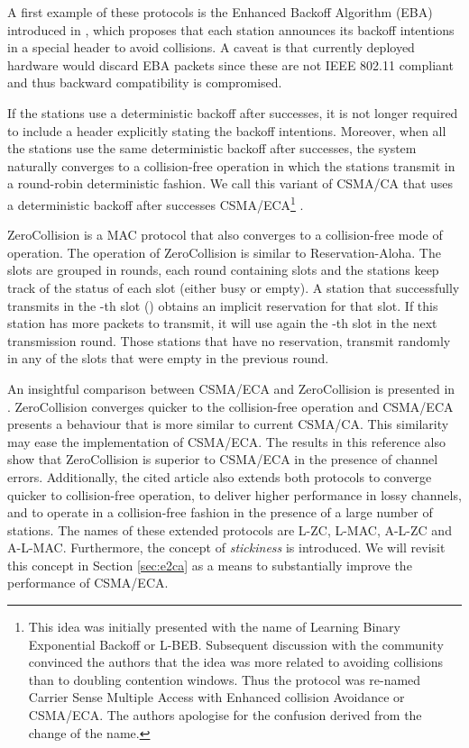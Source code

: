 \documentclass[journal]{IEEEtran}
\begin{document}
A first example of these protocols is the Enhanced Backoff Algorithm (EBA) introduced in \cite{choi2005eei}, which proposes that each station announces its backoff intentions in a special header to avoid collisions. A caveat is that currently deployed hardware would discard EBA packets since these are not IEEE 802.11 compliant and thus backward compatibility is compromised.

If the stations use a deterministic backoff after successes, it is not longer required to include a header explicitly stating the backoff intentions. Moreover, when all the stations use the same deterministic backoff after successes, the system naturally converges to a collision-free operation in which the stations transmit in a round-robin deterministic fashion. We call this variant of CSMA/CA that uses a deterministic backoff after successes CSMA/ECA\footnote{This idea was initially presented with the name of Learning Binary Exponential Backoff or L-BEB. Subsequent discussion with the community convinced the authors that the idea was more related to avoiding collisions than to doubling contention windows. Thus the protocol was re-named Carrier Sense Multiple Access with Enhanced collision Avoidance or CSMA/ECA. The authors apologise for the confusion derived from the change of the name.} \cite{barcelo2008lba}.

ZeroCollision \cite{lee2008daa} is a MAC protocol that also converges to a collision-free mode of operation. The operation of ZeroCollision is similar to Reservation-Aloha. The slots are grouped in rounds, each round containing  slots and the stations keep track of the status of each slot (either busy or empty). A station that successfully transmits in the -th slot () obtains an implicit reservation for that slot. If this station has more packets to transmit, it will use again the -th slot in the next transmission round. Those stations that have no reservation, transmit randomly in any of the slots that were empty in the previous round.

An insightful comparison between CSMA/ECA and ZeroCollision is presented in \cite{fang2009dlm}. ZeroCollision converges quicker to the collision-free operation and CSMA/ECA presents a behaviour that is more similar to current CSMA/CA. This similarity may ease the implementation of CSMA/ECA. The results in this reference also show that ZeroCollision is superior to CSMA/ECA in the presence of channel errors. Additionally, the cited article also extends both protocols to converge quicker to collision-free operation, to deliver higher performance in lossy channels, and to operate in a collision-free fashion in the presence of a large number of stations. The names of these extended protocols are L-ZC, L-MAC, A-L-ZC and A-L-MAC. Furthermore, the concept of \emph{stickiness} is introduced. We will revisit this concept in Section \ref{sec:e2ca} as a means to substantially improve the performance of CSMA/ECA.
\end{document}
